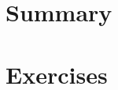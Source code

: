 \begin{comment}
	
	
	
	where all parameter are indexed to model $\mathcal{M}_m$, $\bm{P}_{X_m}=\bm{X}_m(\bm{X}_m^{\top}\bm{X}_m)^{-1}\bm{X}_m$ is the projection matrix on the space generated by the columns of $\bm{X}_m$, and $\bar{y}$ is the sample mean of $\bm{y}$. 
	
	In the Gaussian linear model with independent priors (see Section \ref{sec62}), we have ${\bf{y}}={\bf{X}}\bm{\bm{\beta}}+\bm{\mu}$ such that $\bm{\mu}\sim N(\bf{0},\sigma^2\bf{I}_N)$, $\bm{\beta} \sim N(\bm{\beta}_0, {\bf{B}}_0)$ and $\sigma^2 \sim IG(\alpha_0/2, \delta_0/2)$. Then, $\bm{\beta}|\sigma^2, {\bf{y}}, {\bf{X}} \sim N(\bm{\beta}_n, \sigma^2{\bf{B}}_n)$ and $\sigma^2|\bm{\beta}, {\bf{y}}, {\bf{X}} \sim IG(\alpha_n/2, \delta_n/2)$, where  ${\bf{B}}_n = ({\bf{B}}_0^{-1} + \sigma^{-2} {\bf{X}}^{\top}{\bf{X}})^{-1}$, $\bm{\beta}_n= {\bf{B}}_n({\bf{B}}_0^{-1}\bm{\beta}_0 + \sigma^{-2} {\bf{X}}^{\top}{\bf{y}})$, $\alpha_n = \alpha_0 + N$ and $\delta_n = \delta_0 + ({\bf{y}}-{\bf{X}}\bm{\beta})^{\top}({\bf{y}}-{\bf{X}}\bm{\beta})$.
	
	We can use as reference the model with all the regressors. Then,
	\begin{align*}
		\pi(\bm{\beta}=\bm{0}_{0k}|\mathcal{M}_2)=(2\pi)^{-2/10}|\bm{B}_{0}|^{-1/2}\exp\left\{-\frac{1}{2}(\bm{0}_{0k}-\bm{\beta}_{0})^{\top}\bm{B}_{0}^{-1}(\bm{0}_{0k}-\bm{\beta}_{0})\right\}
	\end{align*}  
	
	\begin{align*}
		\pi(\bm{\beta}=\bm{0}_{0m}|\mathcal{M}_2)&=(2\pi\sigma^2)^{-2/7}|g_m\bm{X}_m^{\top}\bm{X}_m|^{-1/2}\\
		&\times\exp\left\{-\frac{1}{2\sigma^2}(\bm{0}_{0m}-\bm{\beta}_{0})^{\top}(g\bm{X}_m^{\top}\bm{X}_m)^{-1}(\bm{0}_{0m}-\bm{\beta}_{0})\right\}
	\end{align*}  
\end{comment}
    

\section{Summary}\label{sec10_7}

\section{Exercises}\label{sec10_8}

